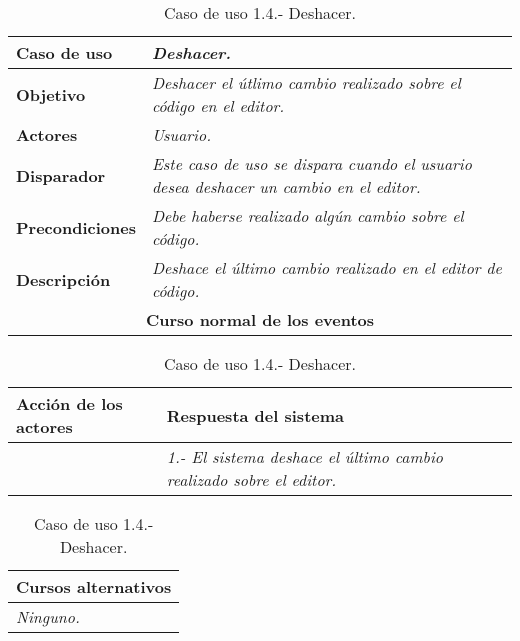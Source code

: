 \documentclass[twoside,a4paper,11pt]{book}
\begin{document}
\begin{table}[!ht]
    \centering
    \begin{tabular}{|p{4cm}|p{11.5cm}|}
    \hline

    \textbf{Caso de uso} & \textit{Deshacer.}\\
    \hline

    \textbf{Objetivo} & \textit{Deshacer el útlimo cambio realizado sobre el código en el editor.}\\
    \hline

    \textbf{Actores} & \textit{Usuario.}\\
    \hline

    \textbf{Disparador} & \textit{Este caso de uso se dispara cuando el usuario desea deshacer un cambio en el editor.}\\
    \hline

    \textbf{Precondiciones} & \textit{Debe haberse realizado algún cambio sobre el código.}\\
    \hline

    \textbf{Descripción} & \textit{Deshace el último cambio realizado en el editor de código.}\\
    \hline

    \multicolumn{2}{|c|}{\textbf{Curso normal de los eventos}}\\
    \hline

    \end{tabular}
    \begin{tabular}{|p{7.75cm}|p{7.75cm}|}
    \hspace{2cm}\textbf{Acción de los actores} & \hspace{1.75cm}\textbf{Respuesta del sistema}\\
    \hline

    &
    \textit{1.- El sistema deshace el último cambio realizado sobre el editor.}
    \\
    \hline
    \end{tabular}

    \begin{tabular}{|p{15.9cm}|}
      \hspace{6cm}\textbf{Cursos alternativos}\\
      \hline     
	\textit{Ninguno.}
      \\
      \hline
    \end{tabular}
    \caption{Caso de uso 1.4.- Deshacer.}
\end{table}
\end{document}
